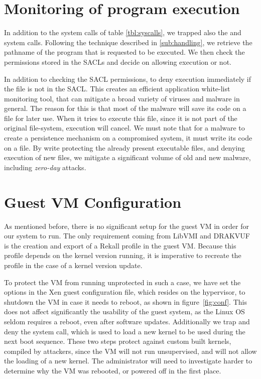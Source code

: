\section{Monitoring of program execution}

\par In addition to the system calls of table \ref{tbl:syscalls}, we trapped also the  and  system calls. Following the technique described in \ref{sub:handling}, we retrieve the pathname of the program that is requested to be executed. We then check the permissions stored in the \acp{SACL} and decide on allowing execution or not.

\par In addition to checking the \ac{SACL} permissions, to deny execution immediately if the file is not in the \ac{SACL}. This creates an efficient application white-list monitoring tool, that can mitigate a broad variety of viruses and malware in general. The reason for this is that most of the malware will save its code on a file for later use. When it tries to execute this file, since it is not part of the original file-system, execution will cancel. We must note that for a malware to create a persistence mechanism on a compromised system, it must write its code on a file. By write protecting the already present executable files, and denying execution of new files, we mitigate a significant volume of old and new malware, including \emph{zero-day} attacks.



\section{Guest \ac{VM} Configuration}\label{sub:conf}

As mentioned before, there is no significant setup for the guest \ac{VM} in order for our system to run. The only requirement coming from LibVMI and DRAKVUF is the creation and export of a Rekall profile in the guest \ac{VM}. Because this profile depends on the kernel version running, it is imperative to recreate the profile in the case of a kernel version update. 

\par To protect the \ac{VM} from running unprotected in such a case, we have set the options in the Xen guest configuration file, which resides on the hypervisor, to shutdown the \ac{VM} in case it needs to reboot, as shown in figure~\ref{fig:conf}. This does not affect significantly the usability of the guest system, as the Linux \ac{OS} seldom requires a reboot, even after software updates. Additionally we trap and deny the  system call, which is used to load a new kernel to be used during the next boot sequence. These two steps protect against custom built kernels, compiled by attackers, since the \ac{VM} will not run unsupervised, and will not allow the loading of a new kernel. The administrator will need to investigate harder to determine why the \ac{VM} was rebooted, or powered off in the first place.

